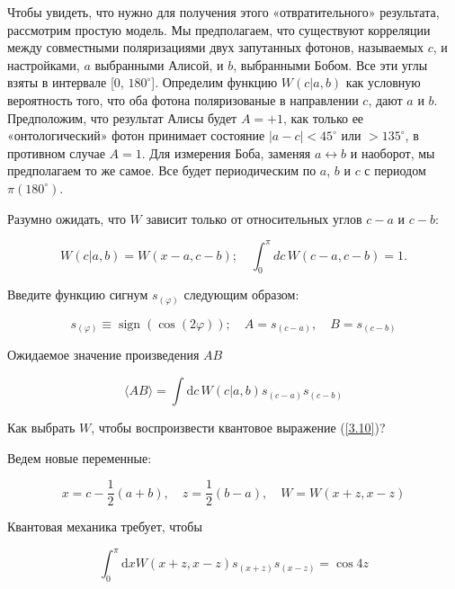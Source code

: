 \documentclass[main.tex]{subfiles}
\begin{document}
Чтобы увидеть, что нужно для получения этого «отвратительного» результата, рассмотрим простую модель. Мы предполагаем, что существуют корреляции между совместными поляризациями двух запутанных фотонов, называемых $c$, и настройками, $a$ выбранными Алисой, и $b$, выбранными Бобом. Все эти углы взяты в интервале [0, $180^\circ$]. Определим функцию $W(c | a, b)$ как условную вероятность того, что оба фотона поляризованые в направлении $c$, дают $a$ и $b$. Предположим, что результат Алисы будет $A = + 1$, как только ее «онтологический» фотон принимает состояние $| a-c | < 45^\circ$ или $ > 135^\circ$, в противном случае $A = 1$. Для измерения Боба, заменяя $a\leftrightarrow b$ и наоборот, мы предполагаем то же самое. Все будет периодическим по $a$, $b$ и $c$ с периодом $\pi (180^\circ)$.

Разумно ожидать, что $W$ зависит только от относительных углов $c-a$ и $c-b$:

\begin{equation}\label{3.15}
	W (c | a, b) = W (x-a, c-b); \quad  \int^\pi_0 dc\, W (c-a, c-b) = 1.
\end{equation}

Введите функцию сигнум $s_{(\varphi)}$ следующим образом:

\begin{equation}\label{3.16}
	s_{(\varphi)} \equiv \operatorname{sign}(\cos (2 \varphi)) ; \quad A=s_{(c-a)}, \quad B=s_{(c-b)}
\end{equation}
                            
Ожидаемое значение произведения $AB$


\begin{equation}\label{3.17}
	\langle A B\rangle=\int \mathrm{d} c\, W(c | a, b) s_{(c-a)} s_{(c-b)}
\end{equation}
           
Как выбрать $W$, чтобы воспроизвести квантовое выражение (\ref{3.10})?

Ведем новые переменные:

\begin{equation}\label{3.18}
	x=c-\frac{1}{2}(a+b), \quad z=\frac{1}{2}(b-a), \quad W=W(x+z, x-z)
\end{equation}
           
Квантовая механика требует, чтобы


\begin{equation}\label{3.19}
	\int_{0}^{\pi} \mathrm{d} x W(x+z, x-z) s_{(x+z)} s_{(x-z)}=\cos 4 z
\end{equation}
\end{document}
